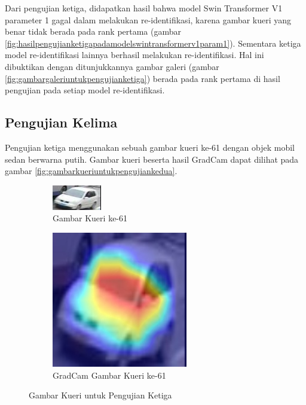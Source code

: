 Dari pengujian ketiga, didapatkan hasil bahwa model Swin Transformer V1 parameter 1 gagal dalam melakukan re-identifikasi, 
karena gambar kueri yang benar tidak berada pada rank pertama (gambar 
\ref{fig:hasilpengujianketigapadamodelswintransformerv1param1}). Sementara ketiga model re-identifikasi lainnya berhasil 
melakukan re-identifikasi. Hal ini dibuktikan dengan ditunjukkannya gambar galeri (gambar \ref{fig:gambargaleriuntukpengujianketiga})
berada pada rank pertama di hasil pengujian pada setiap model re-identifikasi.

\subsection{Pengujian Kelima}

Pengujian ketiga menggunakan sebuah gambar kueri ke-61 dengan objek mobil sedan berwarna putih. Gambar kueri 
beserta hasil GradCam dapat dilihat pada gambar \ref{fig:gambarkueriuntukpengujiankedua}.

\begin{figure}[h!]
  \centering
  \begin{subfigure}{.5\textwidth}
    \centering
    \includegraphics[width=.4\linewidth]{gambar/Que61_1120.jpg}
    \caption{Gambar Kueri ke-61}
    \label{gambarkuerinomorenamsatu}
  \end{subfigure}%
  \begin{subfigure}{.5\textwidth}
    \centering
    \includegraphics[width=.4\linewidth]{gambar/GradCamQue61_1120.jpg}
    \caption{GradCam Gambar Kueri ke-61}
    \label{gradcamgambarkuerinomorenamsatu}
  \end{subfigure}
  \caption{Gambar Kueri untuk Pengujian Ketiga}
  \label{fig:gambarkueriuntukpengujianketiga}
\end{figure}


